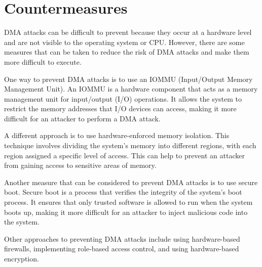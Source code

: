 \section{Countermeasures}

DMA attacks can be difficult to prevent because they occur at a hardware level and are not visible to the operating system or CPU. However, there are some measures that can be taken to reduce the risk of DMA attacks and make them more difficult to execute.

One way to prevent DMA attacks is to use an IOMMU (Input/Output Memory Management Unit). An IOMMU is a hardware component that acts as a memory management unit for input/output (I/O) operations. It allows the system to restrict the memory addresses that I/O devices can access, making it more difficult for an attacker to perform a DMA attack.

A different approach is to use hardware-enforced memory isolation. This technique involves dividing the system's memory into different regions, with each region assigned a specific level of access. This can help to prevent an attacker from gaining access to sensitive areas of memory.

Another measure that can be considered to prevent DMA attacks is to use secure boot. Secure boot is a process that verifies the integrity of the system's boot process. It ensures that only trusted software is allowed to run when the system boots up, making it more difficult for an attacker to inject malicious code into the system.

Other approaches to preventing DMA attacks include using hardware-based firewalls, implementing role-based access control, and using hardware-based encryption.


